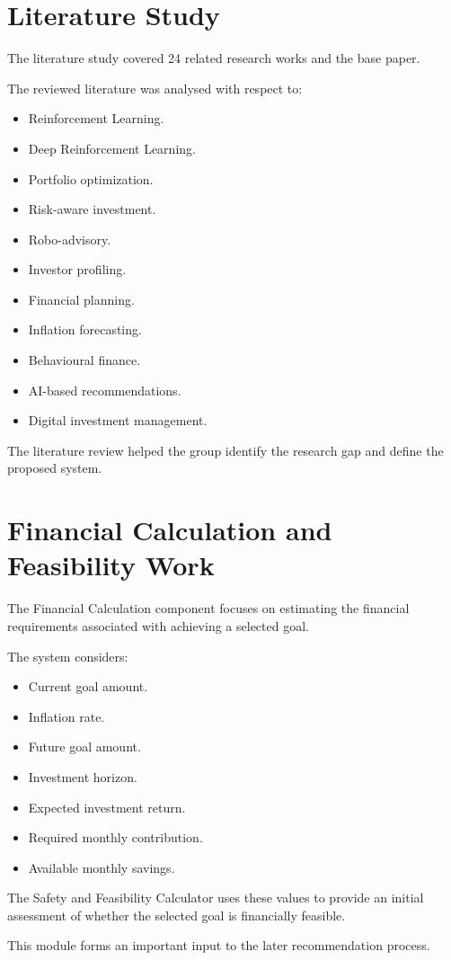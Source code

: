 \section{Literature Study}
The literature study covered 24 related research works and the base paper.

The reviewed literature was analysed with respect to:
\begin{itemize}
	\item Reinforcement Learning.
	\item Deep Reinforcement Learning.
	\item Portfolio optimization.
	\item Risk-aware investment.
	\item Robo-advisory.
	\item Investor profiling.
	\item Financial planning.
	\item Inflation forecasting.
	\item Behavioural finance.
	\item AI-based recommendations.
	\item Digital investment management.
\end{itemize}
The literature review helped the group identify the research gap and define the proposed system.

\section{Financial Calculation and Feasibility Work}
The Financial Calculation component focuses on estimating the financial requirements associated with achieving a selected goal.

The system considers:
\begin{itemize}
	\item Current goal amount.
	\item Inflation rate.
	\item Future goal amount.
	\item Investment horizon.
	\item Expected investment return.
	\item Required monthly contribution.
	\item Available monthly savings.
\end{itemize}
The Safety and Feasibility Calculator uses these values to provide an initial assessment of whether the selected goal is financially feasible.

This module forms an important input to the later recommendation process.

